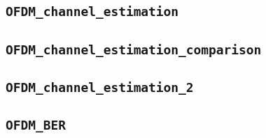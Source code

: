 \documentclass[10pt]{article}
\numberwithin{equation}{section}
\begin{document}
\subsection*{\texttt{OFDM\_channel\_estimation}}


\subsection*{\texttt{OFDM\_channel\_estimation\_comparison}}


\subsection*{\texttt{OFDM\_channel\_estimation\_2}}


\subsection*{\texttt{OFDM\_BER}}

\end{document}
